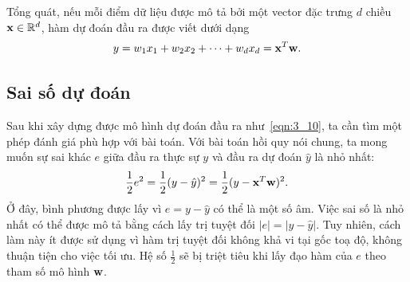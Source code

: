 



Tổng quát, nếu mỗi điểm dữ liệu được mô tả bởi một vector đặc trưng $d$ chiều $\mathbf{x} \in \mathbb{R}^d$, hàm dự đoán đầu ra được viết dưới dạng
\begin{equation}
\label{eqn:3_10}
y = w_1x_1 + w_2x_2 + \dots + w_dx_d = \mathbf{x}^T\mathbf{w}.
\end{equation}

\subsection{Sai số dự đoán}
Sau khi xây dựng được mô hình dự đoán đầu ra như~\eqref{eqn:3_10}, ta cần tìm
một phép đánh giá phù hợp với bài toán. Với bài toán hồi quy nói chung, ta
mong muốn sự sai khác $e$ giữa đầu ra thực sự $y$ và đầu ra dự đoán
$\hat{y}$ là nhỏ nhất:
\begin{equation}
\frac{1}{2}e^2 = \frac{1}{2}(y - \hat{y})^2 =
\frac{1}{2}(y - \mathbf{x}^T\mathbf{w})^2.
\end{equation}
Ở đây, bình phương được lấy vì $e = y - \hat{y}$ có thể là một số âm. Việc sai số
là nhỏ nhất có thể được mô tả bằng cách lấy trị tuyệt đối $|e| = |y - \hat{y}|$.
Tuy nhiên, cách làm này ít được sử dụng vì hàm trị tuyệt đối không khả vi tại
gốc toạ độ, không thuận tiện cho việc tối ưu. Hệ số $\frac{1}{2}$ sẽ bị
triệt tiêu khi lấy đạo hàm của $e$ theo tham số mô hình $\mathbf{w}$.



